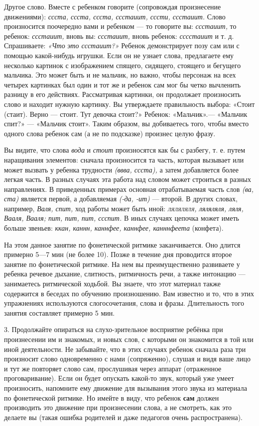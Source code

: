 \documentclass[a5paper]{book}
\renewcommand{\emph}[1]{\textit{#1}}
\begin{document}
Другое слово. Вместе с ребенком говорите (сопровождая произнесение
движениями): \emph{ссста, ссста, ссста, ссстаиит, сссти, ссстаиит.}
Слово произносится поочередно вами и ребенком --- то говорите вы:
\emph{ссстаиит,} то ребенок: \emph{ссстаиит,} вновь вы: \emph{ссстаиит,}
вновь ребенок: \emph{сссстаиит} и т. д. Спрашиваете: \emph{«Что}
\emph{это ссстаиит?»} Ребенок демонстрирует позу сам или с помощью
какой-нибудь игрушки. Если он не узнает слова, предлагаете ему несколько
картинок с изображением спящего, сидящего, стоящего и бегущего мальчика.
Это может быть и не мальчик, но важно, чтобы персонаж на всех четырех
картинках был один и тот же и ребенок сам мог бы четко вычленить разницу
в его действиях. Рассматривая картинки, он продолжает произносить слово
и находит нужную картинку. Вы утверждаете правильность выбора: «Стоит
(стаит). Верно --- стоит. Тут девочка стоит?» Ребенок: «Мальчик».---
«Мальчик спит?» --- «Мальчик стоит». Таким образом, вы добиваетесь того,
чтобы вместо одного слова ребенок сам (а не по подсказке) произнес целую
фразу.

Вы видите, что слова \emph{вода} и \emph{стоит} произносятся как бы с
разбегу, т. е. путем наращивания элементов: сначала произносится та
часть, которая вызывает или может вызвать у ребенка трудности
\emph{(ввва, ссста),} а затем добавляется более легкая часть. В разных
случаях эта работа над словом может строиться в разных направлениях. В
приведенных примерах основная отрабатываемая часть слов \emph{(ва, ста)}
является первой, а добавляемая \emph{(-да, -ит)} --- второй. В других
словах, например, \emph{Валя, спит,} ход работы может быть иной:
\emph{\textsc{ляляляля,} ляляляля, ляля, Вааля, Вааля; пит, пит, пит,
ссспит.} В иных случаях цепочка может иметь больше звеньев: \emph{ккан,
каннн, каннфее, каннфее, канннфеета} (конфета).

На этом данное занятие по фонетической ритмике заканчивается. Оно длится
примерно 5---7 мин (не более 10). Позже в течение дня проводится второе
занятие по фонетической ритмике. На нем вы преимущественно развиваете у
ребенка речевое дыхание, слитность, ритмичность речи, а также интонацию
--- занимаетесь ритмической ходьбой. Вы знаете, что этот материал также
содержится в беседах по обучению произношению. Вам известно и то, что в
этих упражнениях используются слогосочетания, слова и фразы.
Длительность того занятия составляет примерно 5 мин.

3. Продолжайте опираться на слухо-зрительное восприятие ребёнка при
произнесении им и знакомых, и новых слов, с которыми он знакомится в той
или иной деятельности. Не забывайте, что в этих случаях ребенок сначала
раза три произносит слово одновременно с нами (сопряженно), слушая и
видя ваше лицо и тут же повторяет слово сам, прослушивая через аппарат
(отраженное проговаривание). Если он будет опускать какой-то звук,
который уже умеет произносить, напомните ему движение для вызывания
этого звука из материала по фонетической ритмике. Но имейте в виду, что
ребенок \textbf{сам} должен производить это движение при произнесении
слова, а не смотреть, как это делаете вы (такая ошибка родителей и даже
педагогов очень распространена).
\end{document}
